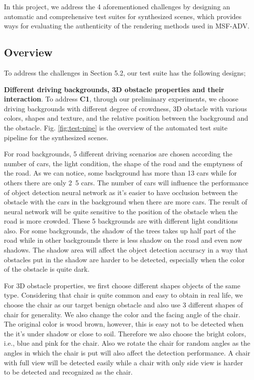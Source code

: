 In this project, we address the 4 aforementioned challenges by designing an automatic and comprehensive test suites for synthesized scenes,
which provides ways for evaluating the authenticity of the rendering methods used in MSF-ADV\cite{msf-adv}.

\subsection{Overview}

To address the challenges in Section 5.2, our test suite has the following designs;

\textbf{Different driving backgrounds, 3D obstacle properties and their interaction}. 
To address \textbf{C1}, through our preliminary experiments, we choose driving backgrounds with different degree of crowdness, 
3D obstacle with various colors, shapes and texture, and the relative position between the background and the obstacle.
Fig. \ref{fig:test-pipe} is the overview of the automated test suite pipeline for the synthesized scenes.

For road backgrounds, 5 different driving scenarios are chosen according the number of cars, the light condition, the shape of the road and the emptyness of the road.
As we can notice, some background has more than 13 cars while for others there are only 2~5 cars.
The number of cars will influence the performance of object detection neural network as it's easier to have occlusion between the obstacle with the cars in the background when there are more cars.
The result of neural network will be quite sensitive to the position of the obstacle when the road is more crowded.
These 5 backgrounds are with different light conditions also. 
For some backgrounds, the shadow of the trees takes up half part of the road while in other backgrounds there is less shadow on the road and even now shadows.
The shadow area will affect the object detection accuracy in a way that obstacles put in the shadow are harder to be detected, 
especially when the color of the obstacle is quite dark.

For 3D obstacle properties, we first choose different shapes objects of the same type.
Considering that chair is quite common and easy to obtain in real life, 
we choose the chair as our target benign obstacle and also use 3 different shapes of chair for generality.
We also change the color and the facing angle of the chair.
The original color is wood brown, however, this is easy not to be detected when the it's under shadow or close to soil.
Therefore we also choose the bright colors, i.e., blue and pink for the chair.
Also we rotate the chair for random angles as the angles in which the chair is put will also affect the detection performance.
A chair with full view will be detected easily  while a chair with only side view is harder to be detected and recognized as the chair.

